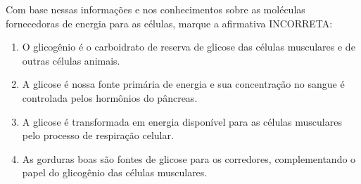Com base nessas informações e nos conhecimentos sobre as moléculas fornecedoras de energia para as células, marque a afirmativa INCORRETA:\begin{enumerate}
\item O glicogênio é o carboidrato de reserva de glicose das células musculares e de outras células animais.
\item A glicose é nossa fonte primária de energia e sua concentração no sangue é controlada pelos hormônios
        do pâncreas.
\item A glicose é transformada em energia disponível para as células musculares pelo processo de respiração
        celular.
\item As gorduras boas são fontes de glicose para os corredores, complementando o papel do glicogênio das
        células musculares.\end{enumerate}
